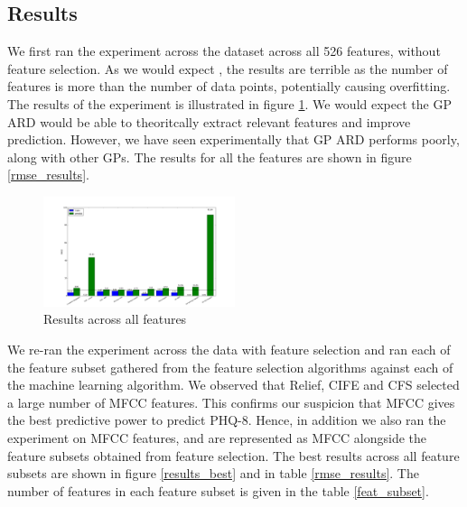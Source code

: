 \documentclass{article}
\begin{document}
	\subsection{Results}
	We first ran the experiment across the dataset across all 526 features, without feature selection. 
	As we would expect \cite{Cawley2014}, the results are terrible as the number of features is more than the number of data points, potentially causing overfitting. 
	The results of the experiment is illustrated in figure \ref{results_all}. 
	We would expect the GP ARD would be able to theoritcally extract relevant features and improve prediction.
	However, we have seen experimentally that GP ARD performs poorly, along with other GPs. 
	The results for all the features are shown in figure \ref{rmse_results}. \\

	\begin{figure}[h]
 		\begin{center}
		\includegraphics[width=0.5\textwidth]{results_all} 
  		\end{center}
  		\caption{Results across all features}
  		\label{results_all}
 	\end{figure}
	
	We re-ran the experiment across the data with feature selection and ran each of the feature subset gathered from the feature selection algorithms against each of the machine learning algorithm. 
	We observed that Relief, CIFE and CFS selected a large number of MFCC features. 
	This confirms our suspicion that MFCC gives the best predictive power to predict PHQ-8. 
	Hence, in addition we also ran the experiment on MFCC features, and are represented as MFCC alongside the feature subsets obtained from feature selection. 
	The best results across all feature subsets are shown in figure \ref{results_best} and in table \ref{rmse_results}. 
	The number of features in each feature subset is given in the table \ref{feat_subset}. \\
\end{document}
